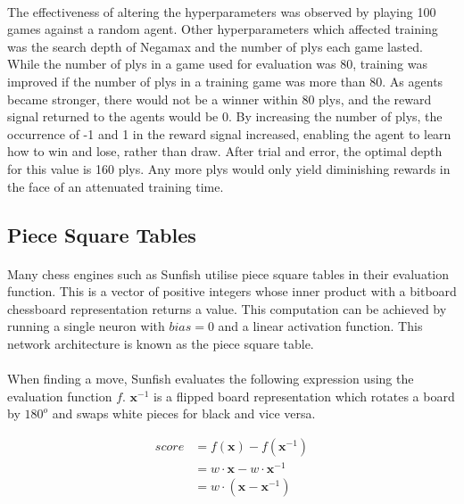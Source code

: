 \documentclass[12pt,a4paper]{book}
\begin{document}
\paragraph{} The effectiveness of altering the hyperparameters was observed by playing 100 games against a random agent. Other hyperparameters which affected training was the search depth of Negamax and the number of plys each game lasted. While the number of plys in a game used for evaluation was 80, training was improved if the number of plys in a training game was more than 80. As agents became stronger, there would not be a winner within 80 plys, and the reward signal returned to the agents would be 0. By increasing the number of plys, the occurrence of -1 and 1 in the reward signal increased, enabling the agent to learn how to win and lose, rather than draw. After trial and error, the optimal depth for this value is 160 plys. Any more plys would only yield diminishing rewards in the face of an attenuated training time.

\subsection{Piece Square Tables}

\paragraph{} Many chess engines such as Sunfish utilise piece square tables in their evaluation function. This is a vector of positive integers whose inner product with a bitboard chessboard representation returns a value. This computation can be achieved by running a single neuron with $bias = 0$ and a linear activation function. This network architecture is known as the piece square table.

\paragraph{} When finding a move, Sunfish evaluates the following expression using the evaluation function $f$. $\textbf{x}^{-1}$ is a flipped board representation which rotates a board by $180^o$ and swaps white pieces for black and vice versa.

\begin{align*}
  score &= f(\textbf{x}) - f(\textbf{x}^{-1}) \\
        &= w \cdot \textbf{x} - w \cdot \textbf{x}^{-1} \\
        &= w \cdot (\textbf{x} - \textbf{x}^{-1}) \\
\end{align*}
\end{document}
